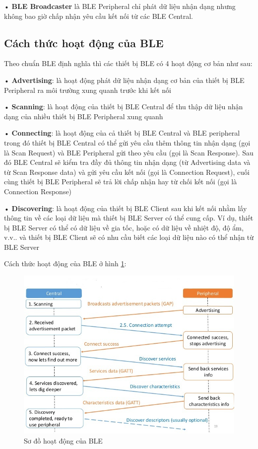 • \textbf{BLE Broadcaster} là BLE Peripheral chỉ phát dữ liệu nhận dạng nhưng không bao giờ chấp nhận yêu cầu kết nối từ các BLE Central.
 
\subsection{Cách thức hoạt động của BLE}
Theo chuẩn BLE định nghĩa thì các thiết bị BLE có 4 hoạt động cơ bản như sau:

• \textbf{Advertising}: là hoạt động phát dữ liệu nhận dạng cơ bản của thiết bị BLE Peripheral ra môi trường xung quanh trước khi kết nối

• \textbf{Scanning}: là hoạt động của thiết bị BLE Central để thu thập dữ liệu nhận dạng của nhiều thiết bị BLE Peripheral xung quanh

• \textbf{Connecting}: là hoạt động của cả thiết bị BLE Central và BLE peripheral trong đó thiết bị BLE Central có thể gửi yêu cầu thêm thông tin nhận dạng (gọi là Scan Request) và BLE Peripheral gửi theo yêu cầu (gọi là Scan Response). Sau đó BLE Central sẽ kiểm tra đầy đủ thông tin nhận dạng (từ Advertising data và từ Scan Response data) và gửi yêu cầu kết nối (gọi là Connection Request), cuối cùng thiết bị BLE Peripheral sẽ trả lời chấp nhận hay từ chối kết nối (gọi là Connection Response)

• \textbf{Discovering}: là hoạt động của thiết bị BLE Client sau khi kết nối nhằm lấy thông tin về các loại dữ liệu mà thiết bị BLE Server có thể cung cấp. Ví dụ, thiết bị BLE Server có thể có dữ liệu về gia tốc, hoặc có dữ liệu về nhiệt độ, độ ẩm, v.v.. và thiết bị BLE Client sẽ có nhu cầu biết các loại dữ liệu nào có thể nhận từ BLE Server

Cách thức hoạt động của BLE ở hình \ref{fig: btwork}:
	\begin{figure}[h]
		\includegraphics[width=1.0\textwidth]{btwork}
		\caption[Sơ đồ hoạt động của BLE]{Sơ đồ hoạt động của BLE}
		\label{fig: btwork}
	\end{figure}
	
